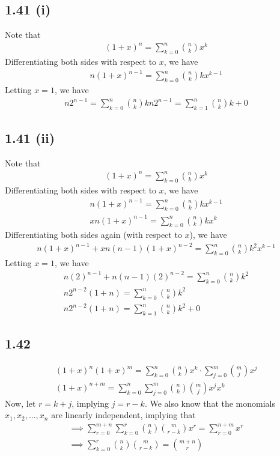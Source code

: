 \documentclass[letterpaper,12pt]{article}
\theoremstyle{definition}
\begin{document}
\subsection*{1.41 (i)}
Note that
\begin{align*}
    (1+x)^n = \sum^{n}_{k=0} \binom nk x^k
\end{align*}
Differentiating both sides with respect to $x$, we have
\begin{align*}
    n(1+x)^{n-1} = \sum^{n}_{k=0} \binom nk kx^{k-1}
\end{align*}
Letting $x=1$, we have
\begin{align*}
    n2^{n-1} = \sum^{n}_{k=0} \binom nk k
    n2^{n-1} = \sum^{n}_{k=1} \binom nk k + 0
\end{align*}

\subsection*{1.41 (ii)}
Note that
\begin{align*}
    (1+x)^n = \sum^{n}_{k=0} \binom nk x^k
\end{align*}
Differentiating both sides with respect to $x$, we have
\begin{align*}
    n(1+x)^{n-1} = \sum^{n}_{k=0} \binom nk kx^{k-1}\\
    xn(1+x)^{n-1} = \sum^{n}_{k=0} \binom nk kx^{k}
\end{align*}
Differentiating both sides again (with respect to $x$), we have
\begin{align*}
    n(1+x)^{n-1} + xn(n-1)(1+x)^{n-2}  = \sum^{n}_{k=0} \binom nk k^2x^{k-1}
\end{align*}
Letting $x=1$, we have
\begin{align*}
    n(2)^{n-1} + n(n-1)(2)^{n-2}  = \sum^{n}_{k=0} \binom nk k^2\\
    n2^{n-2}(1 + n)  = \sum^{n}_{k=0} \binom nk k^2\\
    n2^{n-2}(1 + n)  = \sum^{n}_{k=1} \binom nk k^2 + 0
\end{align*}

\subsection*{1.42}

\begin{align*}
    (1+x)^n(1+x)^m = \sum^{n}_{k=0} \binom nk x^k \cdot \sum^{m}_{j=0} \binom mj x^j\\
    (1+x)^{n+m} = \sum^{n}_{k=0} \sum^{m}_{j=0} \binom nk \binom mj x^j x^k
\end{align*}
Now, let $r = k + j$, implying $j = r - k$. We also know that the monomials $x_1, x_2,\dots,x_n$ are linearly independent, implying that
\begin{align*}
    \implies \sum^{m+n}_{r=0} \sum^{r}_{k=0} \binom nk \binom m{r-k} x^r = \sum^{n+m}_{r=0} x^r \\
    \implies \sum^{r}_{k=0} \binom nk \binom m{r-k} = \binom {m+n}r
\end{align*}
\end{document}
